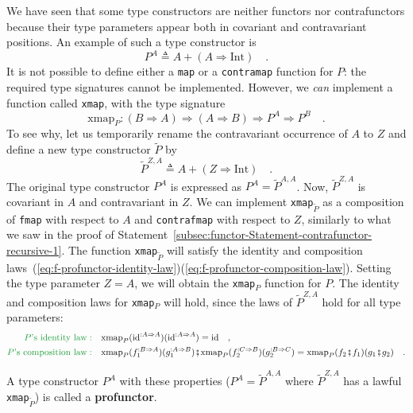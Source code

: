 We have seen that some type constructors are neither functors nor
contrafunctors because their type parameters appear both in covariant
and contravariant positions. An example of such a type constructor
is
\[
P^{A}\triangleq A+\left(A\Rightarrow\text{Int}\right)\quad.
\]
It is not possible to define either a \lstinline!map! or a \lstinline!contramap!
function for $P$: the required type signatures cannot be implemented.
However, we \emph{can} implement a function called \lstinline!xmap!,
with the type signature
\[
\text{xmap}_{P}:\left(B\Rightarrow A\right)\Rightarrow\left(A\Rightarrow B\right)\Rightarrow P^{A}\Rightarrow P^{B}\quad.
\]
To see why, let us temporarily rename the contravariant occurrence
of $A$ to $Z$ and define a new type constructor $\tilde{P}$ by
\[
\tilde{P}^{Z,A}\triangleq A+\left(Z\Rightarrow\text{Int}\right)\quad.
\]
The original type constructor $P^{A}$ is expressed as $P^{A}=\tilde{P}^{A,A}$.
Now, $\tilde{P}^{Z,A}$ is covariant in $A$ and contravariant in
$Z$. We can implement \lstinline!xmap!$_{\tilde{P}}$ as a composition
of \lstinline!fmap! with respect to $A$ and \lstinline!contrafmap!
with respect to $Z$, similarly to what we saw in the proof of Statement~\ref{subsec:functor-Statement-contrafunctor-recursive-1}.
The function \lstinline!xmap!$_{\tilde{P}}$ will satisfy the identity
and composition laws~(\ref{eq:f-profunctor-identity-law})\textendash (\ref{eq:f-profunctor-composition-law}).
Setting the type parameter $Z=A$, we will obtain the \lstinline!xmap!$_{P}$
function for $P$. The identity and composition laws for \lstinline!xmap!$_{P}$
will hold, since the laws of $\tilde{P}^{Z,A}$ hold for all type
parameters:
\begin{align*}
{\color{greenunder}P\text{'s identity law}:}\quad & \text{xmap}_{P}(\text{id}^{:A\Rightarrow A})(\text{id}^{:A\Rightarrow A})=\text{id}\quad,\\
{\color{greenunder}P\text{'s composition law}:}\quad & \text{xmap}_{P}(f_{1}^{:B\Rightarrow A})(g_{1}^{:A\Rightarrow B})\bef\text{xmap}_{P}(f_{2}^{:C\Rightarrow B})(g_{2}^{:B\Rightarrow C})=\text{xmap}_{P}(f_{2}\bef f_{1})(g_{1}\bef g_{2})\quad.
\end{align*}

A type constructor $P^{A}$ with these properties ($P^{A}=\tilde{P}^{A,A}$
where $\tilde{P}^{Z,A}$ has a lawful \lstinline!xmap!$_{\tilde{P}}$)
is called a \textbf{profunctor}.

